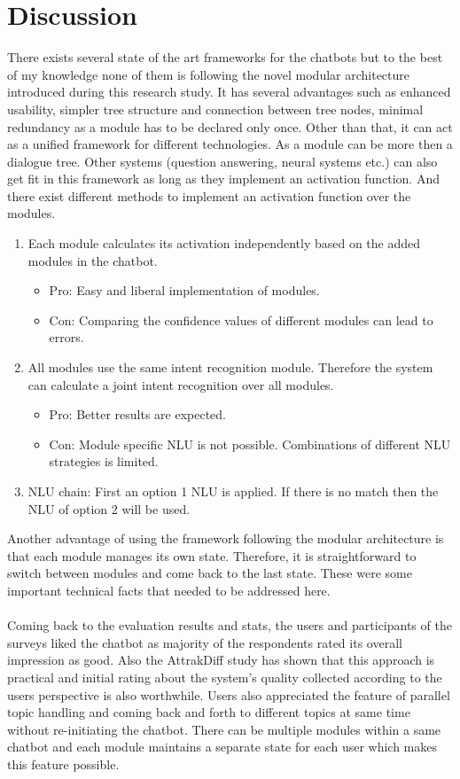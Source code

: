 \section{Discussion}
There exists several state of the art frameworks for the chatbots but to the best of my knowledge none of them is following the novel modular architecture introduced during this research study. It has several advantages such as enhanced usability, simpler tree structure and connection between tree nodes, minimal redundancy as a module has to be declared only once. Other than that, it can act as a unified framework for different technologies. As a module can be more then a dialogue tree. Other systems (question answering, neural systems etc.) can also get fit in this framework as long as they implement an activation function. And there exist different methods to implement an activation function over the modules. 
\begin{enumerate}
    \item Each module calculates its activation independently based on the added modules in the chatbot.
    \begin{itemize}
        \item Pro: Easy and liberal implementation of modules.
        \item Con: Comparing the confidence values of different modules can lead to errors.
    \end{itemize}
    \item All modules use the same intent recognition module. Therefore the system can calculate a joint intent recognition over all modules.
    \begin{itemize}
        \item Pro: Better results are expected.
        \item Con: Module specific NLU is not possible. Combinations of different NLU strategies is limited.
    \end{itemize}
    \item NLU chain: First an option 1 NLU is applied. If there is no match then the NLU of option 2 will be used.
\end{enumerate} 
Another advantage of using the framework following the modular architecture is that each module manages its own state. Therefore, it is straightforward to switch between modules and come back to the last state. These were some important technical facts that needed to be addressed here.
\\~\\
Coming back to the evaluation results and stats, the users and participants of the surveys liked the chatbot as majority of the respondents rated its overall impression as good. Also the AttrakDiff study has shown that this approach is practical and initial rating about the system's quality collected according to the users perspective is also worthwhile. Users also appreciated the feature of parallel topic handling and coming back and forth to different topics at same time without re-initiating the chatbot. There can be multiple modules within a same chatbot and each module maintains a separate state for each user which makes this feature possible.

